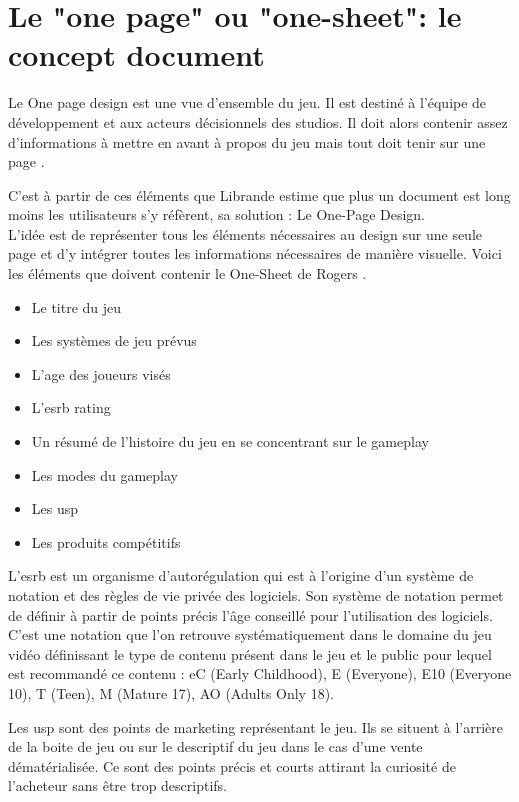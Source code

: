 \section{Le "one page" ou "one-sheet": le concept document}
Le One page design est une vue d'ensemble du jeu. Il est destiné à l'équipe de développement et aux acteurs décisionnels des studios. Il doit alors contenir assez d'informations à mettre en avant à propos du jeu mais tout doit tenir sur une page \cite{LevelUpRogers2014}.

C'est à partir de ces éléments que Librande \cite{onepage_librande} estime que plus un document est long moins les utilisateurs s'y réfèrent, sa solution : Le One-Page Design.\\
L'idée est de représenter tous les éléments nécessaires au design sur une seule page et d'y intégrer toutes les informations nécessaires de manière visuelle. 
Voici les éléments que doivent contenir le One-Sheet de Rogers \cite{LevelUpRogers2014}.
\begin{itemize}
    \item Le titre du jeu
    \item Les systèmes de jeu prévus
    \item L'age des joueurs visés
    \item L'\gls{esrb} rating
    \item Un résumé de l'histoire du jeu en se concentrant sur le gameplay
    \item Les modes du gameplay
    \item Les \gls{usp}
    \item Les produits compétitifs
\end{itemize}

L'\gls{esrb} est un organisme d'autorégulation qui est à l'origine d'un système de notation et des règles de vie privée des logiciels. Son système de notation permet de définir à partir de points précis l'âge conseillé pour l'utilisation des logiciels. C'est une notation que l'on retrouve systématiquement dans le domaine du jeu vidéo définissant le type de contenu présent dans le jeu et le public pour lequel est recommandé ce contenu : eC (Early Childhood), E (Everyone), E10 (Everyone 10\+), T (Teen), M (Mature 17\+), AO (Adults Only 18\+).

Les \gls{usp} sont des points de marketing représentant le jeu. Ils se situent à l'arrière de la boite de jeu ou sur le descriptif du jeu dans le cas d'une vente dématérialisée. Ce sont des points précis et courts attirant la curiosité de l'acheteur sans être trop descriptifs. 

